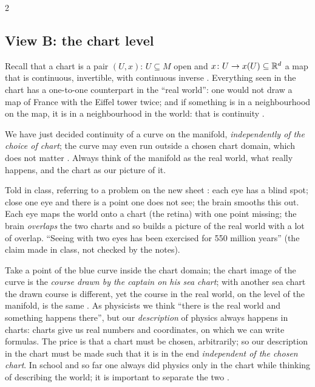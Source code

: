 \begin{paracol}{2}
\subsection{View B: the chart level}\label{ssec:dm-view-b}

Recall that a chart is a pair $(U,x)$: $U\subseteq M$ open and $x\colon U\to x(U)\subseteq\mathbb{R}^d$ a map that is
continuous, invertible, with continuous inverse .
Everything seen in the chart has a one-to-one counterpart in the ``real world'': one would not draw a map of France
with the Eiffel tower twice; and if something is in a neighbourhood on the map, it is in a neighbourhood in the world: that
is continuity .

We have just decided continuity of a curve on the manifold, \emph{independently of the choice of chart}; the curve may even run
outside a chosen chart domain, which does not matter . Always think of the
manifold as the real world, what really happens, and the chart as our picture of it.

\begin{aside}
Told in class, referring to a problem on the new sheet :
each eye has a blind spot; close one eye and there is a point one does not see; the brain smooths this out. Each eye
maps the world onto a chart (the retina) with one point missing; the brain \emph{overlaps} the two charts and so builds a picture of
the real world with a lot of overlap. ``Seeing with two eyes has been exercised for 550 million years''
(the claim made in class, not checked by the notes).
\end{aside}

Take a point of the blue curve inside the chart domain; the chart image of the curve is the \emph{course drawn by the
captain on his sea chart}; with another sea chart the drawn course is different, yet the course in the real world, on the
level of the manifold, is the same . As physicists we think ``there is the real
world and something happens there'', but our \emph{description} of physics always happens in charts: charts give us real
numbers and coordinates, on which we can write formulas. The price is that a chart must be chosen, arbitrarily; so
our description in the chart must be made such that it is in the end \emph{independent of the chosen chart}. In school
and so far one always did physics only in the chart while thinking of describing the world; it is important to separate the two
.


\end{paracol}
